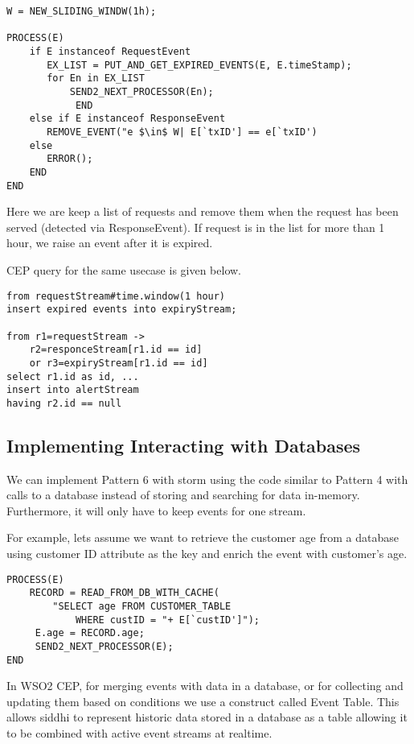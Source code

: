 \documentclass{sig-alternate}
\begin{document}
{\begin{lstlisting}[mathescape, showstringspaces=false]
W = NEW_SLIDING_WINDW(1h); 

PROCESS(E)  
    if E instanceof RequestEvent
       EX_LIST = PUT_AND_GET_EXPIRED_EVENTS(E, E.timeStamp);
       for En in EX_LIST
           SEND2_NEXT_PROCESSOR(En); 
			END        
    else if E instanceof ResponseEvent
       REMOVE_EVENT("e $\in$ W| E[`txID'] == e[`txID') 
    else 
       ERROR();
    END   
END 
\end{lstlisting}


Here we are keep a list of requests and remove them when the request has been served (detected via ResponseEvent). If request is in the list for more than 1 hour, we raise an event after it is expired. 

CEP query for the same usecase is given below. 

\begin{lstlisting}[mathescape, showstringspaces=false]
from requestStream#time.window(1 hour)
insert expired events into expiryStream;

from r1=requestStream -> 
	r2=responceStream[r1.id == id] 
	or r3=expiryStream[r1.id == id]
select r1.id as id, ...
insert into alertStream 
having r2.id == null
\end{lstlisting}



\subsection{Implementing Interacting with Databases}
We can implement Pattern 6 with storm using the code similar to Pattern 4 with calls to a database instead of storing and searching for data in-memory. Furthermore, it will only have to keep events for one stream. 

For example, lets assume we want to retrieve the customer age from a database using customer ID attribute as the key and enrich the event with customer's age. 


\begin{lstlisting}[mathescape, showstringspaces=false]
PROCESS(E) 
	RECORD = READ_FROM_DB_WITH_CACHE(
		"SELECT age FROM CUSTOMER_TABLE 
			WHERE custID = "+ E[`custID']");    
	 E.age = RECORD.age;
	 SEND2_NEXT_PROCESSOR(E); 
END   
\end{lstlisting}



In WSO2 CEP, for merging events with data in a database, or for collecting and updating them based on conditions we use a construct called Event Table. This allows siddhi to represent historic data stored in a database as a table allowing it to be combined with active event streams at realtime. 

}
\end{document}
